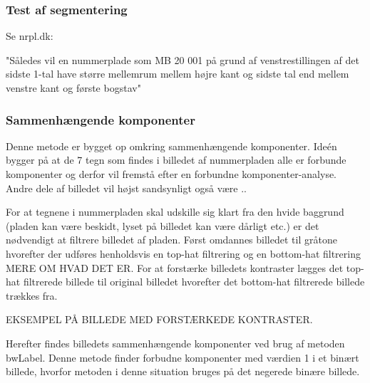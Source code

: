 \subsubsection{Test af segmentering}

Se nrpl.dk: %

"Således vil en nummerplade som MB 20 001 på grund af venstrestillingen af det sidste 1-tal have større mellemrum mellem højre kant og sidste tal end mellem venstre kant og første bogstav"

\subsubsection{Sammenhængende komponenter}

Denne metode er bygget op omkring sammenhængende komponenter. Ideén bygger på at de 7 tegn som findes i billedet af nummerpladen alle er forbunde komponenter og derfor vil fremstå efter en forbundne komponenter-analyse. Andre dele af billedet vil højst sandsynligt også være ..



For at tegnene i nummerpladen skal udskille sig klart fra den hvide baggrund (pladen kan være beskidt, lyset på billedet kan være dårligt etc.) er det nødvendigt at filtrere billedet af pladen. Først omdannes billedet til gråtone hvorefter der udføres henholdsvis en top-hat filtrering og en bottom-hat filtrering MERE OM HVAD DET ER. For at forstærke billedets kontraster lægges det top-hat filtrerede billede til original billedet hvorefter det bottom-hat filtrerede billede trækkes fra.

EKSEMPEL PÅ BILLEDE MED FORSTÆRKEDE KONTRASTER.

Herefter findes billedets sammenhængende komponenter ved brug af metoden bwLabel. Denne metode finder forbudne komponenter med værdien 1 i et binært billede, hvorfor metoden i denne situation bruges på det negerede binære billede.


